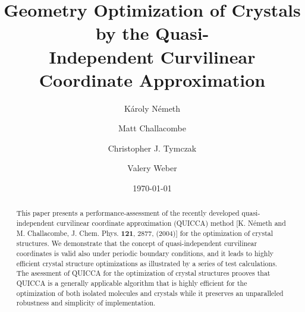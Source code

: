 \documentclass[prl,aps,preprint,superbib,12pt]{revtex4}
\begin{document}
\title{Geometry Optimization of Crystals by the Quasi-\\
       Independent Curvilinear Coordinate Approximation\footnotemark[1]}

\author{K\'aroly N\'emeth\footnotemark[1]}
\author{Matt Challacombe}
\author{Christopher J. Tymczak}
\author{Valery Weber}


\date{\today}

\begin{abstract}
This paper presents a performance-assessment 
of the recently developed quasi-independent curvilinear coordinate
approximation (QUICCA) method [K. N\'emeth and M. Challacombe,
J. Chem. Phys. {\bf 121}, 2877, (2004)] for the optimization of crystal 
structures. 
We demonstrate that the concept of quasi-independent
curvilinear coordinates is valid also under periodic boundary 
conditions,
and it leads to highly efficient crystal structure optimizations
as illustrated by a series of test calculations. 
The asessment of QUICCA for the optimization of crystal structures
prooves that QUICCA is a generally applicable algorithm
that is highly efficient for the optimization of both isolated 
molecules and crystals while it preserves an unparalleled robustness 
and simplicity of implementation.
\end{abstract}


\maketitle

\end{document}
